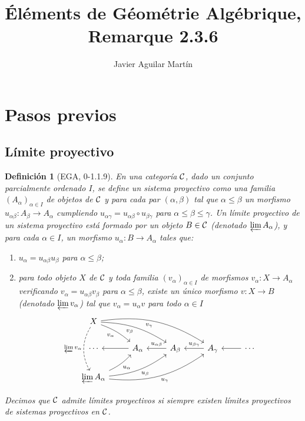 \documentclass[twoside]{article}
\newtheorem{defin}{Definición}[section]
\begin{document}
\title{Éléments de Géométrie Algébrique, Remarque 2.3.6}
\author{Javier Aguilar Martín}
\maketitle

\section{Pasos previos}

\subsection{Límite proyectivo}

\begin{defin}[EGA, 0-1.1.9]
En una categoría ${\mathcal C}$, dado un conjunto parcialmente ordenado $I$, se define un \emph{sistema proyectivo} como una familia $(A_\alpha)_{\alpha\in I}$ de objetos de ${\mathcal C}$ y para cada par $(\alpha,\beta)$ tal que $\alpha\leq\beta$ un morfismo $u_{\alpha\beta}:A_\beta\to A_\alpha$ cumpliendo $u_{\alpha\gamma}=u_{\alpha\beta}\circ u_{\beta\gamma}$ para $\alpha\leq\beta\leq\gamma$. Un \emph{límite proyectivo} de un sistema proyectivo está formado por un objeto $B\in{\mathcal C}$ (denotado $\varprojlim A_\alpha$), y para cada $\alpha\in I$, un morfismo $u_\alpha:B\to A_\alpha$ tales que: 
\begin{enumerate}
\item $u_\alpha=u_{\alpha\beta}u_{\beta}$ para $\alpha\leq\beta$;
\item para todo objeto $X$ de ${\mathcal C}$ y toda familia $(v_\alpha)_{\alpha\in I}$ de morfismos $v_\alpha:X\to A_{\alpha}$ verificando $v_\alpha=u_{\alpha\beta}v_{\beta}$ para $\alpha\leq\beta$, existe un único morfismo $v:X\to B$ (denotado $\varprojlim v_\alpha$) tal que $v_\alpha=u_\alpha v$ para todo $\alpha\in I$
\[
\begin{tikzcd}
X\arrow[drrr, bend left=20, "v_\gamma"']\arrow[drr, bend left=15, "v_\beta"']\arrow[dr, bend left=10, "v_\alpha"']\arrow[dd, dashed, bend right, "\varprojlim v_\alpha"']& & & & \\
\cdots &A_\alpha\arrow[l]  & A_\beta\arrow[l, "u_{\alpha\beta}"']  & \arrow[l, "u_{\beta\gamma}"']A_\gamma &\cdots\arrow[l]\\
\varprojlim A_\alpha\arrow[urrr, bend left=-20, "u_\gamma"']\arrow[urr, bend left=-15, "u_\beta"']\arrow[ur, bend left=-10, "u_\alpha"']&  & & & 
\end{tikzcd}
\]
\end{enumerate}
Decimos que ${\mathcal C}$ \emph{admite límites proyectivos} si siempre existen límites proyectivos de sistemas proyectivos en ${\mathcal C}$. 
\end{defin}
\end{document}
